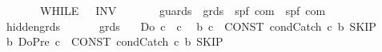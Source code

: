 \begin{isabellebody}
\ \ \ \ \ \ \ \ {\isacharparenleft}{\isachardoublequoteopen}{\isacharparenleft}{}WHILE\ {\isacharparenleft}{\isacharunderscore}{\isacharbar}{\isacharminus}{\isachargreater}\ {\isacharslash}{\isacharunderscore}{\isacharparenright}\ INV\ {\isacharparenleft}{\isacharunderscore}{\isacharparenright}\ {\isacharslash}{\isacharunderscore}{\isacharparenright}{\isachardoublequoteclose}\ \ {\isacharbrackleft}{}{\isacharcomma}{}{\isacharcomma}{}{\isacharcomma}{}{}{}{}{\isacharbrackright}\ {}{}{\isacharparenright}\isanewline
\ \ {\isachardoublequoteopen}{\isacharunderscore}guards{\isachardoublequoteclose}\ {\isacharcolon}{\isacharcolon}\ {\isachardoublequoteopen}grds\ {\isasymRightarrow}\ {\isacharparenleft}{\isacharprime}s{\isacharcomma}{\isacharprime}p{\isacharcomma}{\isacharprime}f{\isacharparenright}\ com\ {\isasymRightarrow}\ {\isacharparenleft}{\isacharprime}s{\isacharcomma}{\isacharprime}p{\isacharcomma}{\isacharprime}f{\isacharparenright}\ com{\isachardoublequoteclose}\ {\isacharparenleft}{\isachardoublequoteopen}{\isacharparenleft}{\isacharunderscore}{\isacharbar}{\isacharminus}{\isachargreater}{\isacharunderscore}\ {\isacharparenright}{\isachardoublequoteclose}\ {\isacharbrackleft}{}{}{\isacharcomma}\ {}{}{\isacharbrackright}\ {}{}{\isacharparenright}\isanewline
\isanewline
{}\isamarkupfalse%
\ {\isacharparenleft}\isanewline
\ \ {\isachardoublequoteopen}{\isacharunderscore}hidden{\isacharunderscore}grds{\isachardoublequoteclose}\ \ \ \ \ \ {\isacharcolon}{\isacharcolon}\ {\isachardoublequoteopen}grds{\isachardoublequoteclose}\ {\isacharparenleft}{\isachardoublequoteopen}{\isasymdots}{\isachardoublequoteclose}{\isacharparenright}\isanewline
\isanewline
{}\isamarkupfalse%
\isanewline
\ \ {\isachardoublequoteopen}{\isacharunderscore}Do\ c{\isachardoublequoteclose}\ {\isacharequal}{\isachargreater}\ {\isachardoublequoteopen}c{\isachardoublequoteclose}\isanewline
\ \ {\isachardoublequoteopen}b{\isasymbullet}\ c{\isachardoublequoteclose}\ {\isacharequal}{\isachargreater}\ {\isachardoublequoteopen}CONST\ condCatch\ c\ b\ SKIP{\isachardoublequoteclose}\isanewline
\ \ {\isachardoublequoteopen}b{\isasymbullet}\ {\isacharparenleft}{\isacharunderscore}DoPre\ c{\isacharparenright}{\isachardoublequoteclose}\ {\isacharless}{\isacharequal}\ {\isachardoublequoteopen}CONST\ condCatch\ c\ b\ SKIP{\isachardoublequoteclose}\isanewline

\end{isabellebody}
